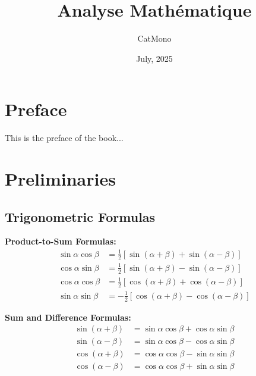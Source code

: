 \documentclass[11pt]{../../TexTemplate/elegantbook}
\title{Analyse Mathématique} %
\author{CatMono} %
\date{July, 2025} %
\begin{document}
\maketitle %

\frontmatter        %
\tableofcontents    %

\chapter{Preface}   %
This is the preface of the book...

\mainmatter         %

\chapter{Preliminaries} %
\section{Trigonometric Formulas} %

\textbf{Product-to-Sum Formulas:}
\begin{align*}
\sin\alpha \cos\beta &= \frac{1}{2} \left[ \sin(\alpha + \beta) + \sin(\alpha - \beta) \right] \\
\cos\alpha \sin\beta &= \frac{1}{2} \left[ \sin(\alpha + \beta) - \sin(\alpha - \beta) \right] \\
\cos\alpha \cos\beta &= \frac{1}{2} \left[ \cos(\alpha + \beta) + \cos(\alpha - \beta) \right] \\
\sin\alpha \sin\beta &= -\frac{1}{2} \left[ \cos(\alpha + \beta) - \cos(\alpha - \beta) \right]
\end{align*}

\textbf{Sum and Difference Formulas:}
\begin{align*}
\sin(\alpha + \beta) &= \sin\alpha \cos\beta + \cos\alpha \sin\beta \\
\sin(\alpha - \beta) &= \sin\alpha \cos\beta - \cos\alpha \sin\beta \\
\cos(\alpha + \beta) &= \cos\alpha \cos\beta - \sin\alpha \sin\beta \\
\cos(\alpha - \beta) &= \cos\alpha \cos\beta + \sin\alpha \sin\beta
\end{align*}
\end{document}
